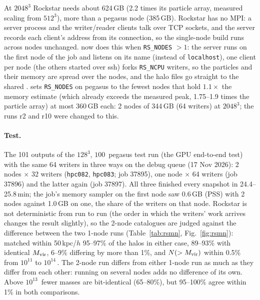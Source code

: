 
At $2048^3$ Rockstar needs about 624\,GB (2.2 times its particle array, measured scaling from $512^3$), more than a
pegasus node (385\,GB). Rockstar has no MPI: a server process and the writer/reader clients talk over TCP sockets, and
the server records each client's address from its connection, so the single-node build runs across nodes unchanged.
 now does this when \texttt{RS\_NODES} $>1$: the server runs on the first node of the job and
listens on its name (instead of \texttt{localhost}), one client per node (the others started over ssh) forks
\texttt{RS\_NCPU} writers, so the particles and their memory are spread over the nodes, and the halo files go straight
to the shared .  sets \texttt{RS\_NODES} on pegasus to the fewest nodes that hold
$1.1\times$ the memory estimate (which already exceeds the measured peak, 1.75--1.9 times the particle array) at most
360\,GB each: 2 nodes of 344\,GB (64 writers) at $2048^3$; the runs r2 and r10 were changed to this.

\paragraph{Test.} The 101 outputs of the $128^3$, $100$\,\Mpch{} pegasus test run (the GPU end-to-end test) with the
same 64 writers in three ways on the debug queue (17 Nov 2026): 2 nodes $\times$ 32 writers (\texttt{hpc082},
\texttt{hpc083}; job 37895), one node $\times$ 64 writers (job 37896) and the latter again (job 37897). All three
finished every snapshot in 24.4--25.8\,min; the job's memory sampler on the first node saw 0.6\,GB (PSS) with 2 nodes
against 1.0\,GB on one, the share of the writers on that node. Rockstar is not deterministic from run to run (the
order in which the writers' work arrives changes the result slightly), so the 2-node catalogues are judged against
the difference between the two 1-node runs (Table~\ref{tab:rsmn}, Fig.~\ref{fig:rsmn}): matched within 50\,kpc/$h$
95--97\% of the halos in either case, 89--93\% with identical $M_{\rm vir}$, 6--9\% differing by more than 1\%, and
$N(>M_{\rm vir})$ within 0.5\% from $10^{11}$ to $10^{14}$\,\Msunh. The 2-node run differs from either 1-node run as
much as they differ from each other: running on several nodes adds no difference of its own. Above $10^{13}$\,\Msunh{}
fewer masses are bit-identical (65--80\%), but 95--100\% agree within 1\% in both comparisons.

